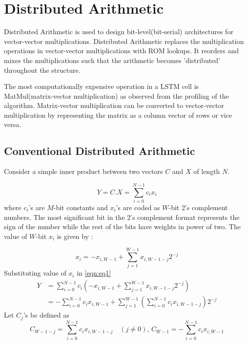 \chapter{Distributed Arithmetic}

Distributed Arithmetic is used to design bit-level(bit-serial) architectures for vector-vector multiplications.
Distributed Arithmetic replaces the multiplication operations in vector-vector multiplications with ROM lookups. It reorders and mixes the multiplications such that the arithmetic becomes 'distributed' throughout the structure.

The most computationally expensive operation in a LSTM cell is MatMul(matrix-vector multiplication) as observed from the profiling of the algorithm. Matrix-vector multiplication can be converted to vector-vector multiplication by representing the matrix as a column vector of rows or vice versa.

\section{Conventional Distributed Arithmetic}
Consider a simple inner product between two vectors $C$ and $X$ of length $N$.

\begin{equation}\label{eqn:eq1}
Y = C.X = \sum_{i=0}^{N-1} c_ix_i 
\end{equation}
where $c_i$'s are $M$-bit constants and $x_i$'s are coded as $W$-bit 2's complement numbers. The most significant bit in the 2's complement format represents the sign of the number while the rest of the bits have weights in power of two. The value of $W$-bit $x_i$ is given by : 

\begin{equation}\label{eqn:eq2}
x_i = -x_{i,W-1} + \sum_{j=1}^{W-1} x_{i, W-1-j}2^{-j}
\end{equation}
Substituting value of $x_i$ in \eqref{eqn:eq1}
\begin{equation}\label{eqn:eq3}
\begin{split}
Y &= \sum_{i=0}^{N-1} c_i  (-x_{i,W-1} + \sum_{j=1}^{W-1} x_{i, W-1-j}2^{-j}) \\
  &= -\sum_{i=0}^{N-1} c_ix_{i, W-1} + \sum_{j=1}^{W-1} (\sum_{i=0}^{N-1} c_ix_{i, W-1-j})2^{-j}
    \end{split}
\end{equation}
Let $C_j$'s be defined as
\begin{equation}
C_{W-1-j} = \sum_{i=0}^{N-1} c_ix_{i, W-1-j}
\quad (j\neq0), \, 
C_{W-1} = - \sum_{i=0}^{N-1} c_ix_{i, W-1}
\end{equation}

